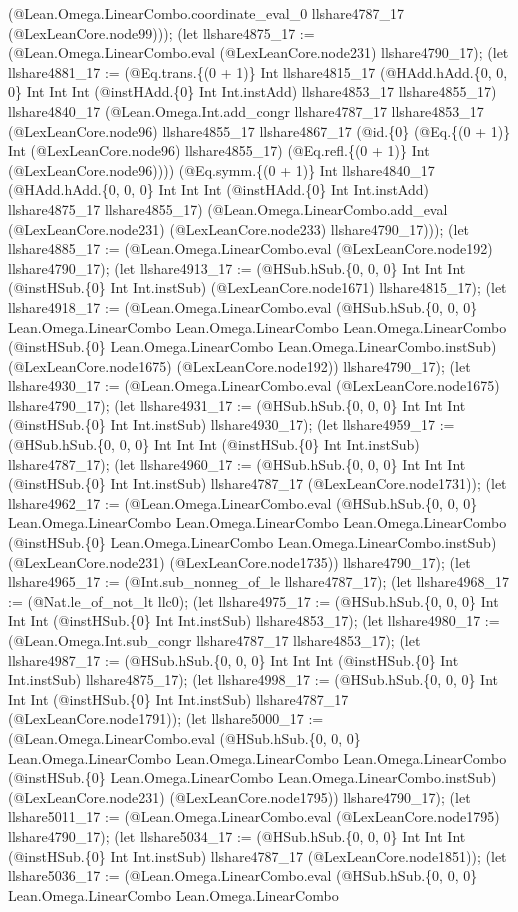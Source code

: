 \documentclass[11pt]{article}
\begin{document}
(@Lean.Omega.LinearCombo.coordinate\_eval\_0 llshare4787\_17 (@LexLeanCore.node99))); (let llshare4875\_17 := (@Lean.Omega.LinearCombo.eval (@LexLeanCore.node231) llshare4790\_17); (let llshare4881\_17 := (@Eq.trans.\{(0 + 1)\} Int llshare4815\_17 (@HAdd.hAdd.\{0, 0, 0\} Int Int Int (@instHAdd.\{0\} Int Int.instAdd) llshare4853\_17 llshare4855\_17) llshare4840\_17 (@Lean.Omega.Int.add\_congr llshare4787\_17 llshare4853\_17 (@LexLeanCore.node96) llshare4855\_17 llshare4867\_17 (@id.\{0\} (@Eq.\{(0 + 1)\} Int (@LexLeanCore.node96) llshare4855\_17) (@Eq.refl.\{(0 + 1)\} Int (@LexLeanCore.node96)))) (@Eq.symm.\{(0 + 1)\} Int llshare4840\_17 (@HAdd.hAdd.\{0, 0, 0\} Int Int Int (@instHAdd.\{0\} Int Int.instAdd) llshare4875\_17 llshare4855\_17) (@Lean.Omega.LinearCombo.add\_eval (@LexLeanCore.node231) (@LexLeanCore.node233) llshare4790\_17))); (let llshare4885\_17 := (@Lean.Omega.LinearCombo.eval (@LexLeanCore.node192) llshare4790\_17); (let llshare4913\_17 := (@HSub.hSub.\{0, 0, 0\} Int Int Int (@instHSub.\{0\} Int Int.instSub) (@LexLeanCore.node1671) llshare4815\_17); (let llshare4918\_17 := (@Lean.Omega.LinearCombo.eval (@HSub.hSub.\{0, 0, 0\} Lean.Omega.LinearCombo Lean.Omega.LinearCombo Lean.Omega.LinearCombo (@instHSub.\{0\} Lean.Omega.LinearCombo Lean.Omega.LinearCombo.instSub) (@LexLeanCore.node1675) (@LexLeanCore.node192)) llshare4790\_17); (let llshare4930\_17 := (@Lean.Omega.LinearCombo.eval (@LexLeanCore.node1675) llshare4790\_17); (let llshare4931\_17 := (@HSub.hSub.\{0, 0, 0\} Int Int Int (@instHSub.\{0\} Int Int.instSub) llshare4930\_17); (let llshare4959\_17 := (@HSub.hSub.\{0, 0, 0\} Int Int Int (@instHSub.\{0\} Int Int.instSub) llshare4787\_17); (let llshare4960\_17 := (@HSub.hSub.\{0, 0, 0\} Int Int Int (@instHSub.\{0\} Int Int.instSub) llshare4787\_17 (@LexLeanCore.node1731)); (let llshare4962\_17 := (@Lean.Omega.LinearCombo.eval (@HSub.hSub.\{0, 0, 0\} Lean.Omega.LinearCombo Lean.Omega.LinearCombo Lean.Omega.LinearCombo (@instHSub.\{0\} Lean.Omega.LinearCombo Lean.Omega.LinearCombo.instSub) (@LexLeanCore.node231) (@LexLeanCore.node1735)) llshare4790\_17); (let llshare4965\_17 := (@Int.sub\_nonneg\_of\_le llshare4787\_17); (let llshare4968\_17 := (@Nat.le\_of\_not\_lt llc0); (let llshare4975\_17 := (@HSub.hSub.\{0, 0, 0\} Int Int Int (@instHSub.\{0\} Int Int.instSub) llshare4853\_17); (let llshare4980\_17 := (@Lean.Omega.Int.sub\_congr llshare4787\_17 llshare4853\_17); (let llshare4987\_17 := (@HSub.hSub.\{0, 0, 0\} Int Int Int (@instHSub.\{0\} Int Int.instSub) llshare4875\_17); (let llshare4998\_17 := (@HSub.hSub.\{0, 0, 0\} Int Int Int (@instHSub.\{0\} Int Int.instSub) llshare4787\_17 (@LexLeanCore.node1791)); (let llshare5000\_17 := (@Lean.Omega.LinearCombo.eval (@HSub.hSub.\{0, 0, 0\} Lean.Omega.LinearCombo Lean.Omega.LinearCombo Lean.Omega.LinearCombo (@instHSub.\{0\} Lean.Omega.LinearCombo Lean.Omega.LinearCombo.instSub) (@LexLeanCore.node231) (@LexLeanCore.node1795)) llshare4790\_17); (let llshare5011\_17 := (@Lean.Omega.LinearCombo.eval (@LexLeanCore.node1795) llshare4790\_17); (let llshare5034\_17 := (@HSub.hSub.\{0, 0, 0\} Int Int Int (@instHSub.\{0\} Int Int.instSub) llshare4787\_17 (@LexLeanCore.node1851)); (let llshare5036\_17 := (@Lean.Omega.LinearCombo.eval (@HSub.hSub.\{0, 0, 0\} Lean.Omega.LinearCombo Lean.Omega.LinearCombo 
\end{document}
